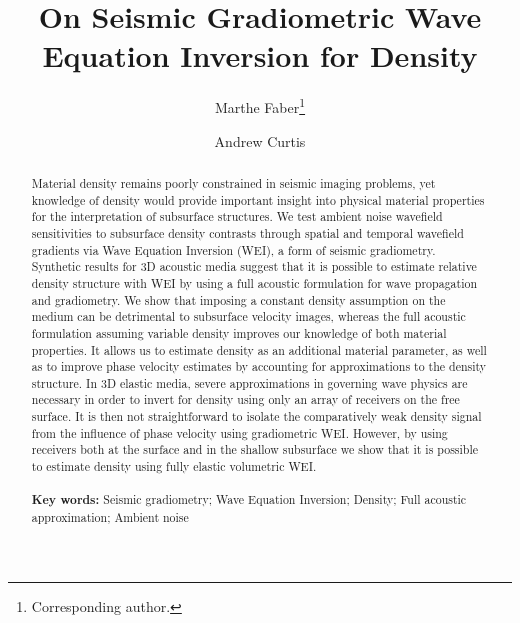 \documentclass[]{article}
\title{On Seismic Gradiometric Wave Equation Inversion for Density}
\author[]{ \large Marthe Faber\thanks{Corresponding author.} }
\author[]{ \large Andrew Curtis}
\affil[]{\small University of Edinburgh, School of Geosciences, Edinburgh, UK \linebreak \linebreak
		 \textit{E-mails}: M.Faber@sms.ed.ac.uk (M.Faber), Andrew.Curtis@ed.ac.uk (A.Curtis)}
\date{}
\providecommand{\keywords}[1]
{
	\small	
	\textbf{\textbf{Key words:}} #1
}
\begin{document}
	\captionsetup[subfigure]{position=top, labelfont=bf,textfont=normalfont,singlelinecheck=off,justification=raggedright}
	\maketitle
	
	\begin{abstract}
		\noindent%
		Material density remains poorly constrained in seismic imaging problems, yet knowledge of density would provide important insight into physical material properties for the interpretation of subsurface structures. We test ambient noise wavefield sensitivities to subsurface density contrasts through spatial and temporal wavefield gradients via Wave Equation Inversion (WEI), a form of seismic gradiometry. Synthetic results for 3D acoustic media suggest that it is possible to estimate relative density structure with WEI by using a full acoustic formulation for wave propagation and gradiometry. We show that imposing a constant density assumption on the medium can be detrimental to subsurface velocity images, whereas the full acoustic formulation assuming variable density improves our knowledge of both material properties. It allows us to estimate density as an additional material parameter, as well as to improve phase velocity estimates by accounting for approximations to the density structure. In 3D elastic media, severe approximations in governing wave physics are necessary in order to invert for density using only an array of receivers on the free surface. It is then not straightforward to isolate the comparatively weak density signal from the influence of phase velocity using gradiometric WEI. However, by using receivers both at the surface and in the shallow subsurface we show that it is possible to estimate density using fully elastic volumetric WEI. \\ \\%
		\keywords{Seismic gradiometry; Wave Equation Inversion; Density; Full acoustic approximation; Ambient noise}
	\end{abstract}
\end{document}
